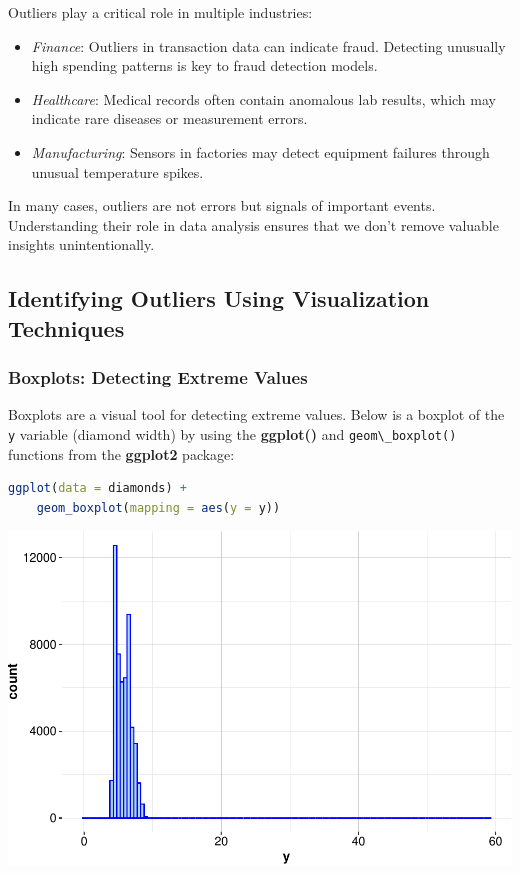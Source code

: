 \documentclass[
]{book}
\newcommand{\passthrough}[1]{#1}
\providecommand{\tightlist}{%
  \setlength{\itemsep}{0pt}\setlength{\parskip}{0pt}}
\theoremstyle{definition}
\theoremstyle{definition}
\theoremstyle{definition}
\theoremstyle{definition}
\theoremstyle{remark}
\begin{document}
Outliers play a critical role in multiple industries:

\begin{itemize}
\tightlist
\item
  \emph{Finance}: Outliers in transaction data can indicate fraud. Detecting unusually high spending patterns is key to fraud detection models.
\item
  \emph{Healthcare}: Medical records often contain anomalous lab results, which may indicate rare diseases or measurement errors.
\item
  \emph{Manufacturing}: Sensors in factories may detect equipment failures through unusual temperature spikes.
\end{itemize}

In many cases, outliers are not errors but signals of important events. Understanding their role in data analysis ensures that we don't remove valuable insights unintentionally.

\subsection*{Identifying Outliers Using Visualization Techniques}\label{identifying-outliers-using-visualization-techniques}

\subsubsection*{Boxplots: Detecting Extreme Values}\label{boxplots-detecting-extreme-values}

Boxplots are a visual tool for detecting extreme values. Below is a boxplot of the \passthrough{\lstinline!y!} variable (diamond width) by using the \textbf{ggplot()} and \passthrough{\lstinline!geom\_boxplot()!} functions from the \textbf{ggplot2} package:

\begin{lstlisting}[language=R]
ggplot(data = diamonds) +
    geom_boxplot(mapping = aes(y = y))
\end{lstlisting}

\begin{center}\includegraphics[width=0.7\linewidth]{data-preparation_files/figure-latex/unnamed-chunk-5-1} \end{center}
\end{document}
